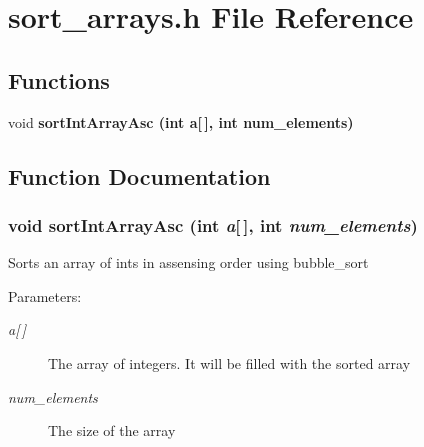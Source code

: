 \section{sort\_\-arrays.h File Reference}
\label{sort__arrays_8h}
\subsection*{Functions}
\begin{CompactItemize}
\item 
void \bf{sort\-Int\-Array\-Asc} (int a[$\,$], int num\_\-elements)
\end{CompactItemize}


\subsection{Function Documentation}
\subsubsection{\setlength{\rightskip}{0pt plus 5cm}void sort\-Int\-Array\-Asc (int {\em a}[$\,$], int {\em num\_\-elements})}\label{sort__arrays_8h_9d9289829617c48dbe1b63e75e806ea8}


Sorts an array of ints in assensing order using bubble\_\-sort \begin{Desc}
\item[Parameters:]
\begin{description}
\item[{\em a\mbox{[}$\,$\mbox{]}}]The array of integers. It will be filled with the sorted array \item[{\em num\_\-elements}]The size of the array \end{description}
\end{Desc}
